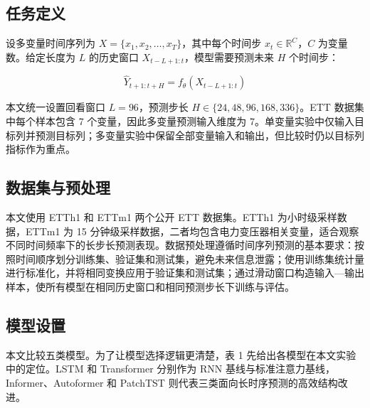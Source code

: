 \subsection{任务定义}\label{ux4efbux52a1ux5b9aux4e49}

设多变量时间序列为 \(X=\{x_1,x_2,\ldots,x_T\}\)，其中每个时间步 \(x_t \in \mathbb{R}^{C}\)，\(C\) 为变量数。给定长度为 \(L\) 的历史窗口 \(X_{t-L+1:t}\)，模型需要预测未来 \(H\) 个时间步：

\[
\hat{Y}_{t+1:t+H}=f_{\theta}(X_{t-L+1:t})
\]

本文统一设置回看窗口 \(L=96\)，预测步长 \(H \in \{24,48,96,168,336\}\)。ETT 数据集中每个样本包含 7 个变量，因此多变量预测输入维度为 7。单变量实验中仅输入目标列并预测目标列；多变量实验中保留全部变量输入和输出，但比较时仍以目标列指标作为重点。

\subsection{数据集与预处理}\label{ux6570ux636eux96c6ux4e0eux9884ux5904ux7406}

本文使用 ETTh1 和 ETTm1 两个公开 ETT 数据集。ETTh1 为小时级采样数据，ETTm1 为 15 分钟级采样数据，二者均包含电力变压器相关变量，适合观察不同时间频率下的长步长预测表现。数据预处理遵循时间序列预测的基本要求：按照时间顺序划分训练集、验证集和测试集，避免未来信息泄露；使用训练集统计量进行标准化，并将相同变换应用于验证集和测试集；通过滑动窗口构造输入---输出样本，使所有模型在相同历史窗口和相同预测步长下训练与评估。

\subsection{模型设置}\label{ux6a21ux578bux8bbeux7f6e}

本文比较五类模型。为了让模型选择逻辑更清楚，表 1 先给出各模型在本文实验中的定位。LSTM 和 Transformer 分别作为 RNN 基线与标准注意力基线，Informer、Autoformer 和 PatchTST 则代表三类面向长时序预测的高效结构改进。

